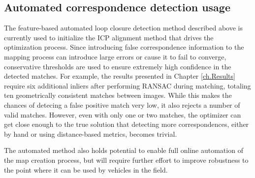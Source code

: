 \subsection{Automated correspondence detection usage}

The feature-based automated loop closure detection method described above is currently used to initialize the ICP alignment method that drives the optimization process. Since introducing false correspondence information to the mapping process can introduce large errors or cause it to fail to converge, conservative thresholds are used to ensure extremely high confidence in the detected matches. For example, the results presented in Chapter \ref{ch.Results} require six additional inliers after performing RANSAC during matching, totaling ten geometrically consistent matches between images. While this makes the chances of detecing a false positive match very low, it also rejects a number of valid matches. However, even with only one or two matches, the optimizer can get close enough to the true solution that detecting more correspondences, either by hand or using distance-based metrics, becomes trivial.

The automated method also holds potential to enable full online automation of the map creation process, but will require further effort to improve robustness to the point where it can be used by vehicles in the field. 



